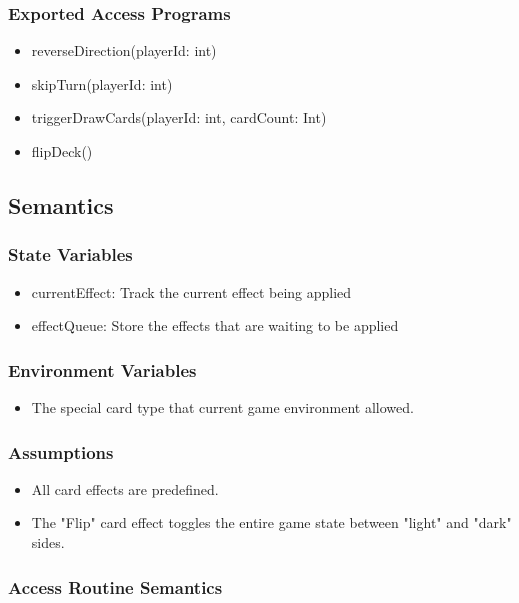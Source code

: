 \documentclass[12pt, titlepage]{article}
\begin{document}
\subsubsection{Exported Access Programs}

\begin{itemize}
\item reverseDirection(playerId: int)
\item skipTurn(playerId: int)
\item triggerDrawCards(playerId: int, cardCount: Int)
\item flipDeck()
\end{itemize}

\subsection{Semantics}

\subsubsection{State Variables}
\begin{itemize}
\item currentEffect: Track the current effect being applied
\item effectQueue: Store the effects that are waiting to be applied
\end{itemize}

\subsubsection{Environment Variables}
\begin{itemize}
    \item The special card type that current game environment allowed.
\end{itemize}

\subsubsection{Assumptions}
\begin{itemize}
\item All card effects are predefined.
\item The "Flip" card effect toggles the entire game state between "light" and "dark" sides.
\end{itemize}

\subsubsection{Access Routine Semantics}
\end{document}
